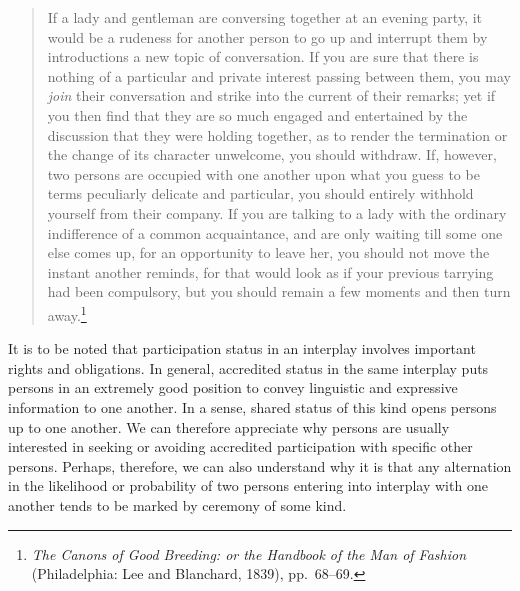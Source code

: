 \documentclass[openany,nobib]{tufte-book}
\begin{document}
\begin{quote}
If a lady and gentleman are conversing together at an evening party, it
would be a rudeness for another person to go up and interrupt them by
introductions a new topic of conversation. If you are sure that there is
nothing of a particular and private interest passing between them, you
may \emph{join} their conversation and strike into the current of their
remarks; yet if you then find that they are so much engaged and
entertained by the discussion that they were holding together, as to
render the termination or the change of its character unwelcome, you
should withdraw. If, however, two persons are occupied with one another
upon what you guess to be terms peculiarly delicate and particular, you
should entirely withhold yourself from their company. If you are talking
to a lady with the ordinary indifference of a common acquaintance, and
are only waiting till some one else comes up, for an opportunity to
leave her, you should not move the instant another reminds, for that
would look as if your previous tarrying had been compulsory, but you
should remain a few moments and then turn away.\footnote{\emph{The
  Canons of Good Breeding: or the Handbook of the Man of Fashion}
  (Philadelphia: Lee and Blanchard, 1839), pp.~68--69.}
\end{quote}

\noindent It is to be noted that participation status in an interplay involves
important rights and obligations. In general, accredited status in the
same interplay puts persons in an extremely good position to convey
linguistic and expressive information to one another. In a sense, shared
status of this kind opens persons up to one another. We can therefore
appreciate why persons are usually interested in seeking or avoiding
accredited participation with specific other persons. Perhaps,
therefore, we can also understand why it is that any alternation in the
likelihood or probability of two persons entering into interplay with
one another tends to be marked by ceremony of some kind.
\end{document}
